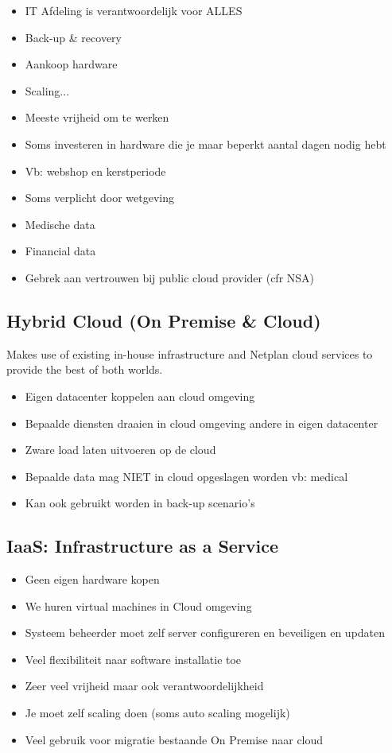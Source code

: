 \documentclass{article}
\begin{document}
\begin{itemize}
    \item IT Afdeling is verantwoordelijk voor ALLES
    \item Back-up \& recovery
    \item Aankoop hardware
    \item Scaling...
    \item Meeste vrijheid om te werken
    \item Soms investeren in hardware die je maar beperkt aantal dagen nodig hebt
    \item Vb: webshop en kerstperiode
    \item Soms verplicht door wetgeving
    \item Medische data
    \item Financial data
    \item Gebrek aan vertrouwen bij public cloud provider (cfr NSA)
\end{itemize}

\subsection{Hybrid Cloud (On Premise \& Cloud)}
Makes use of existing in-house infrastructure and Netplan cloud services to provide the best of both worlds.

\begin{itemize}
    \item Eigen datacenter koppelen aan cloud omgeving
    \item Bepaalde diensten draaien in cloud omgeving andere in eigen datacenter
    \item Zware load laten uitvoeren op de cloud
    \item Bepaalde data mag NIET in cloud opgeslagen worden vb: medical
    \item Kan ook gebruikt worden in back-up scenario’s
\end{itemize}

\subsection{IaaS: Infrastructure as a Service}

\begin{itemize}
    \item Geen eigen hardware kopen
    \item We huren virtual machines in Cloud omgeving
    \item Systeem beheerder moet zelf server configureren en beveiligen en updaten
    \item Veel flexibiliteit naar software installatie toe
    \item Zeer veel vrijheid maar ook verantwoordelijkheid
    \item Je moet zelf scaling doen (soms auto scaling mogelijk)
    \item Veel gebruik voor migratie bestaande On Premise naar cloud
\end{itemize}
\end{document}
